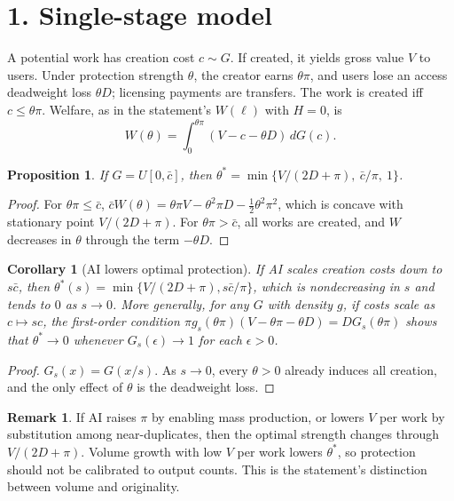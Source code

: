 \documentclass[11pt]{article}
\newtheorem{proposition}[theorem]{Proposition}
\newtheorem{corollary}[theorem]{Corollary}
\theoremstyle{definition}
\newtheorem{remark}[theorem]{Remark}
\begin{document}
\section*{1. Single-stage model}
A potential work has creation cost $c\sim G$. If created, it yields gross value $V$ to users. Under protection strength
$\theta$, the creator earns $\theta\pi$, and users lose an access deadweight loss $\theta D$; licensing payments are transfers.
The work is created iff $c\le\theta\pi$. Welfare, as in the statement's $W(\ell)$ with $H=0$, is
\[
 W(\theta)=\int_0^{\theta\pi}(V-c-\theta D)\,dG(c).
\]
\begin{proposition}\label{prop:opt}
If $G=U[0,\bar c]$, then $\theta^*=\min\{V/(2D+\pi),\ \bar c/\pi,\ 1\}$.
\end{proposition}
\begin{proof}
For $\theta\pi\le\bar c$, $\bar cW(\theta)=\theta\pi V-\theta^2\pi D-\tfrac12\theta^2\pi^2$, which is concave with
stationary point $V/(2D+\pi)$. For $\theta\pi>\bar c$, all works are created, and $W$ decreases in $\theta$ through the
term $-\theta D$.
\end{proof}
\begin{corollary}[AI lowers optimal protection]
If AI scales creation costs down to $s\bar c$, then $\theta^*(s)=\min\{V/(2D+\pi),s\bar c/\pi\}$, which is nondecreasing in
$s$ and tends to $0$ as $s\to0$. More generally, for any $G$ with density $g$, if costs scale as $c\mapsto sc$, the
first-order condition $\pi g_s(\theta\pi)(V-\theta\pi-\theta D)=DG_s(\theta\pi)$ shows that $\theta^*\to0$ whenever
$G_s(\epsilon)\to1$ for each $\epsilon>0$.
\end{corollary}
\begin{proof}
$G_s(x)=G(x/s)$. As $s\to0$, every $\theta>0$ already induces all creation, and the only effect of $\theta$ is the
deadweight loss.
\end{proof}
\begin{remark}
If AI raises $\pi$ by enabling mass production, or lowers $V$ per work by substitution among near-duplicates, then the
optimal strength changes through $V/(2D+\pi)$. Volume growth with low $V$ per work lowers $\theta^*$, so protection should
not be calibrated to output counts. This is the statement's distinction between volume and originality.
\end{remark}
\end{document}
